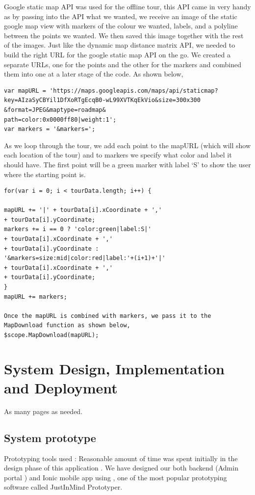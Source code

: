 		Google static map API was used for the offline tour, this API came in very handy as by passing into the API what we wanted, we receive an image of the static google map view with markers of the colour we wanted, labels, and a polyline between the points we wanted. We then saved this image together with the rest of the images. Just like the dynamic map distance matrix API, we needed to build the right URL for the google static map API on the go. We created a separate URLs, one for the points and the other for the markers and combined them into one at a later stage of the code. As shown below,
\begin{verbatim}
var mapURL = 'https://maps.googleapis.com/maps/api/staticmap?
key=AIzaSyCBYil1DfXoRTgEcqB0-wL99XVTKqEkVio&size=300x300
&format=JPEG&maptype=roadmap&
path=color:0x0000ff80|weight:1';
var markers = '&markers=';
\end{verbatim}
		
		As we loop through the tour, we add each point to the mapURL (which will show each location of the tour) and to markers we specify what color and label it should have. The first point will be a green marker with label ‘S’ to show the user where the starting point is. 
		
\begin{verbatim}
for(var i = 0; i < tourData.length; i++) {
			
mapURL += '|' + tourData[i].xCoordinate + ','
+ tourData[i].yCoordinate;
markers += i == 0 ? 'color:green|label:S|' 
+ tourData[i].xCoordinate + ','
+ tourData[i].yCoordinate : 
'&markers=size:mid|color:red|label:'+(i+1)+'|' 
+ tourData[i].xCoordinate + ','
+ tourData[i].yCoordinate;
}
mapURL += markers;
		
Once the mapURL is combined with markers, we pass it to the 
MapDownload function as shown below,
$scope.MapDownload(mapURL);
\end{verbatim}
		



\chapter{System Design, Implementation and Deployment}
As many pages as needed.
	\section {System prototype}
	Prototyping tools used : Reasonable amount of time was spent initially in the design phase of this application . We have designed our both backend (Admin portal ) and Ionic mobile app using , one of the most popular prototyping software called JustInMind Prototyper. 
	
